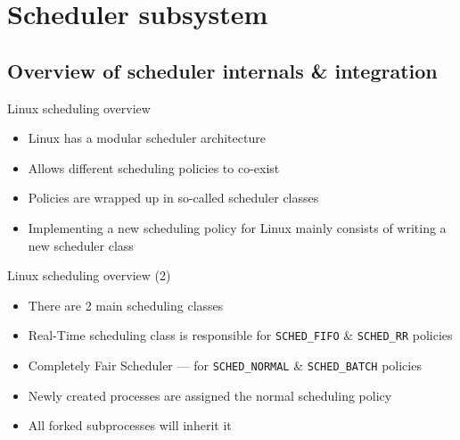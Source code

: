 \section{Scheduler subsystem}

%
%
\subsection{Overview of scheduler internals \& integration}
    
\begin{frame}{Linux scheduling overview}    
    \begin{itemize}
        \item Linux has a modular scheduler architecture \pause
        \item Allows different scheduling policies to co-exist \pause
        \item Policies are wrapped up in so-called scheduler classes \pause
        \item Implementing a new scheduling policy for Linux mainly consists of writing a new scheduler class
    \end{itemize}
\end{frame}

\begin{frame}{Linux scheduling overview (2)}    
    \begin{itemize}
        \item There are 2 main scheduling classes \pause
        \item Real-Time scheduling class is responsible for \texttt{SCHED\_FIFO} \& \texttt{SCHED\_RR} policies \pause
        \item Completely Fair Scheduler --- for \texttt{SCHED\_NORMAL} \& \texttt{SCHED\_BATCH} policies \pause
        \item Newly created processes are assigned the normal scheduling policy \pause
        \item All forked subprocesses will inherit it
    \end{itemize}
\end{frame}


